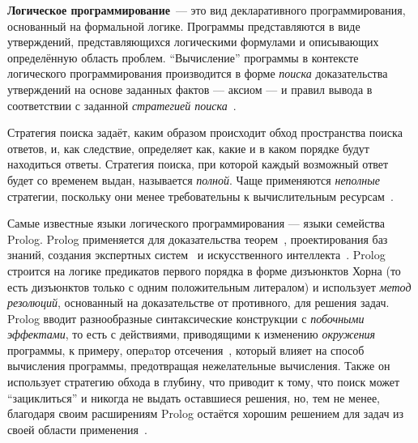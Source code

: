 {\bf Логическое программирование}~--- это вид декларативного программирования,
основанный на формальной логике. Программы представляются в виде
утверждений, представляющихся логическими формулами и описывающих
определённую область проблем.
``Вычисление'' программы в контексте логического программирования производится
в форме \emph{поиска} доказательства утверждений на основе заданных
фактов --- аксиом --- и правил вывода в соответствии с заданной
\emph{стратегией поиска}~\cite{logicMJ}.

Стратегия поиска задаёт,
каким образом происходит обход пространства поиска ответов, и,
как следствие, определяет как, какие и в каком порядке будут находиться
ответы. Стратегия поиска, при которой каждый возможный ответ будет со временем
выдан, называется \emph{полной}. Чаще применяются \emph{неполные} стратегии,
поскольку они менее требовательны к вычислительным ресурсам~\cite{currySearch}.

Самые известные языки логического программирования --- языки семейства Prolog.
Prolog применяется для доказательства теорем~\cite{prologTheorem},
проектирования баз знаний, создания экспертных систем~\cite{prologExSys}
и искусственного интеллекта~\cite{prologInt}.
Prolog строится на логике предикатов первого порядка в форме дизъюнктов
Хорна (то есть дизъюнктов только с одним положительным литералом) и
использует \emph{метод резолюций}, основанный на доказательстве от
противного, для решения задач.
Prolog вводит разнообразные синтаксические конструкции с
\emph{побочными эффектами}, то есть с действиями, приводящими к изменению
\emph{окружения} программы, к примеру, оперaтор отсечения~,
который влияет на способ вычисления программы, предотвращая нежелательные
вычисления.
Также он использует стратегию обхода в глубину, что приводит к тому, что
поиск может ``зациклиться'' и никогда не выдать оставшиеся решения,
но, тем не менее, благодаря своим расширениям Prolog
остаётся хорошим решением для задач из своей области применения~\cite{logicMJ}.





